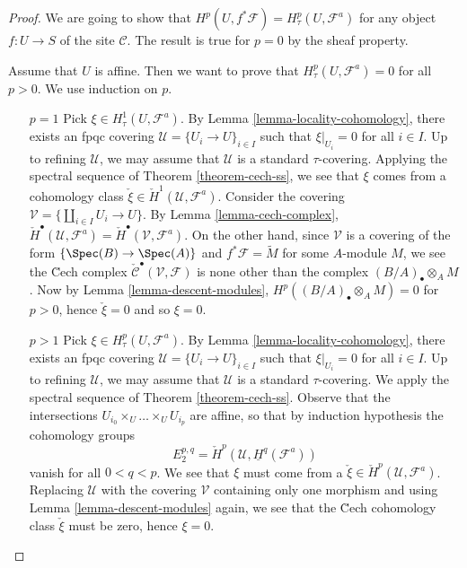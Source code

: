\begin{proof}
We are going to show that
$H^p(U, f^*\mathcal{F}) = H^p_\tau(U, \mathcal{F}^a)$
for any object $f : U \to S$ of the site $\mathcal{C}$.
The result is true for $p = 0$ by the sheaf property.

\medskip\noindent
Assume that $U$ is affine. Then we want to prove that
$H^p_\tau(U, \mathcal{F}^a) = 0$ for all $p > 0$. We use induction on $p$.
\begin{enumerate}
\item[$p = 1$]
Pick $\xi \in H^1_\tau(U, \mathcal{F}^a)$.
By Lemma \ref{lemma-locality-cohomology},
there exists an fpqc covering $\mathcal{U} = \{U_i \to U\}_{i \in I}$
such that $\xi|_{U_i} = 0$ for all $i \in I$. Up to refining
$\mathcal{U}$, we may assume that $\mathcal{U}$ is a standard
$\tau$-covering. Applying the spectral sequence of
Theorem \ref{theorem-cech-ss},
we see that $\xi$ comes from a cohomology class
$\check{\xi} \in \check H^1(\mathcal{U}, \mathcal{F}^a)$.
Consider the covering $\mathcal{V} = \{\coprod_{i\in I} U_i \to U\}$. By
Lemma \ref{lemma-cech-complex},
$\check H^\bullet(\mathcal{U}, \mathcal{F}^a) =
\check H^\bullet(\mathcal{V}, \mathcal{F}^a)$.
On the other hand, since $\mathcal{V}$ is a covering of the form
$\{\Spec(B) \to \Spec(A)\}$ and $f^*\mathcal{F} = \widetilde{M}$
for some $A$-module $M$, we see the \u Cech complex
$\check{\mathcal{C}}^\bullet(\mathcal{V}, \mathcal{F})$
is none other than the complex $(B/A)_\bullet \otimes_A M$.
Now by Lemma \ref{lemma-descent-modules},
$H^p((B/A)_\bullet \otimes_A M) = 0$ for $p>0$, hence $\check{\xi} = 0$ and so
$\xi = 0$.
\item[$p > 1$]
Pick $\xi \in H^p_\tau(U, \mathcal{F}^a)$. By
Lemma \ref{lemma-locality-cohomology},
there exists an fpqc covering $\mathcal{U} = \{U_i \to U\}_{i \in I}$
such that $\xi|_{U_i} = 0$ for all $i \in I$. Up to refining
$\mathcal{U}$, we may assume that $\mathcal{U}$ is a standard
$\tau$-covering. We apply the spectral sequence of
Theorem \ref{theorem-cech-ss}.
Observe that the intersections $U_{i_0} \times_U \ldots \times_U U_{i_p}$
are affine, so that by induction hypothesis the cohomology groups
$$
E_2^{p, q} = \check H^p(\mathcal{U}, \underline{H}^q(\mathcal{F}^a))
$$
vanish for all $0 < q < p$. We see that $\xi$ must come from a
$\check{\xi} \in \check H^p(\mathcal{U}, \mathcal{F}^a)$. Replacing
$\mathcal{U}$ with the covering $\mathcal{V}$ containing only one morphism
and using Lemma \ref{lemma-descent-modules} again,
we see that the \u Cech cohomology class $\check{\xi}$ must be zero,
hence $\xi = 0$.

\end{enumerate}
\end{proof}
